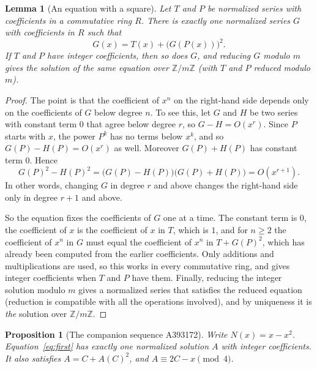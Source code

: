 \documentclass[11pt,a4paper]{article}
\newtheorem{lemma}[theorem]{Lemma}
\newtheorem{proposition}[theorem]{Proposition}
\theoremstyle{definition}
\theoremstyle{remark}
\newcommand{\Z}{\mathbb{Z}}
\begin{document}
\begin{lemma}[An equation with a square]\label{lem:square}
Let $T$ and $P$ be normalized series with coefficients in a commutative ring $R$. There is exactly one normalized
series $G$ with coefficients in $R$ such that
\[
G(x)=T(x)+\bigl(G(P(x))\bigr)^2 .
\]
If $T$ and $P$ have integer coefficients, then so does $G$, and reducing $G$ modulo $m$ gives the solution of the same
equation over $\Z/m\Z$ (with $T$ and $P$ reduced modulo $m$).
\end{lemma}

\begin{proof}
The point is that the coefficient of $x^n$ on the right-hand side depends only on the coefficients of $G$ below degree
$n$. To see this, let $G$ and $H$ be two series with constant term $0$ that agree below degree $r$, so $G-H=O(x^r)$.
Since $P$ starts with $x$, the power $P^k$ has no terms below $x^k$, and so $G(P)-H(P)=O(x^r)$ as well. Moreover
$G(P)+H(P)$ has constant term $0$. Hence
\[
G(P)^2-H(P)^2=\bigl(G(P)-H(P)\bigr)\bigl(G(P)+H(P)\bigr)=O(x^{r+1}).
\]
In other words, changing $G$ in degree $r$ and above changes the right-hand side only in degree $r+1$ and above.

So the equation fixes the coefficients of $G$ one at a time. The constant term is $0$, the coefficient of $x$ is the
coefficient of $x$ in $T$, which is $1$, and for $n\ge2$ the coefficient of $x^n$ in $G$ must equal the coefficient of
$x^n$ in $T+G(P)^2$, which has already been computed from the earlier coefficients. Only additions and multiplications
are used, so this works in every commutative ring, and gives integer coefficients when $T$ and $P$ have them. Finally,
reducing the integer solution modulo $m$ gives a normalized series that satisfies the reduced equation (reduction is
compatible with all the operations involved), and by uniqueness it is \emph{the} solution over $\Z/m\Z$.
\end{proof}

\begin{proposition}[The companion sequence A393172]\label{prop:172}
Write $N(x)=x-x^2$. Equation~\eqref{eq:first} has exactly one normalized solution $A$ with integer coefficients. It also
satisfies $A=C+A(C)^2$, and $A\equiv2C-x\pmod4$.
\end{proposition}
\end{document}
